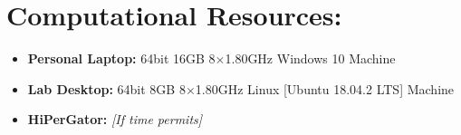 \documentclass[11pt,usenames]{article}
\begin{document}
	\section{Computational Resources:}\label{section:ComputationalResources}
	\begin{itemize}
	\item \textbf{Personal Laptop:} 64bit 16GB 8$\times$1.80GHz Windows 10 Machine
	\item \textbf{Lab Desktop:} 64bit 8GB 8$\times$1.80GHz Linux [Ubuntu 18.04.2 LTS] Machine
	\item \textbf{HiPerGator:} \textit{[If time permits]}
	\end{itemize}	
		
		
	
\end{document}
